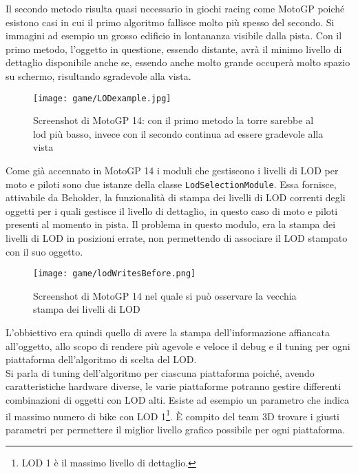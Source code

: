 Il secondo metodo risulta quasi necessario in giochi racing come MotoGP poiché esistono casi in cui il primo algoritmo fallisce molto più spesso del secondo. Si immagini ad esempio un grosso edificio in lontananza visibile dalla pista. Con il primo metodo, l'oggetto in questione, essendo distante, avrà il minimo livello di dettaglio disponibile anche se, essendo anche molto grande occuperà molto spazio su schermo, risultando sgradevole alla vista.\\

\begin{figure}[h!] 
	\centering 
	\hspace*{-0.05\columnwidth}\texttt{[image: game/LODexample.jpg]} 
	\caption[Screenshot di MotoGP 14]{Screenshot di MotoGP 14: con il primo metodo la torre sarebbe al lod più basso, invece con il secondo continua ad essere gradevole alla vista}
\end{figure} 

Come già accennato in MotoGP 14 i moduli che gestiscono i livelli di LOD per moto e piloti sono due istanze della classe \texttt{LodSelectionModule}. Essa fornisce, attivabile da Beholder, la funzionalità di stampa dei livelli di LOD correnti degli oggetti per i quali gestisce il livello di dettaglio, in questo caso di moto e piloti presenti al momento in pista. Il problema in questo modulo, era la stampa dei livelli di LOD in posizioni errate, non permettendo di associare il LOD stampato con il suo oggetto. 

\begin{figure}[h!] 
	\centering 
	\hspace*{-0.05\columnwidth}\texttt{[image: game/lodWritesBefore.png]}
	\caption{Screenshot di MotoGP 14 nel quale si può osservare la vecchia stampa dei livelli di LOD}
\end{figure}

L'obbiettivo era quindi quello di avere la stampa dell'informazione affiancata all'oggetto, allo scopo di rendere più agevole e veloce il debug e il tuning per ogni piattaforma dell'algoritmo di scelta del LOD.\\

Si parla di tuning dell'algoritmo per ciascuna piattaforma poiché, avendo caratteristiche hardware diverse, le varie piattaforme potranno gestire differenti combinazioni di oggetti con LOD alti. Esiste ad esempio un parametro che indica il massimo numero di bike con LOD 1\footnote{LOD 1 è il massimo livello di dettaglio.}. È compito del team 3D trovare i giusti parametri per permettere il miglior livello grafico possibile per ogni piattaforma.\\ 

